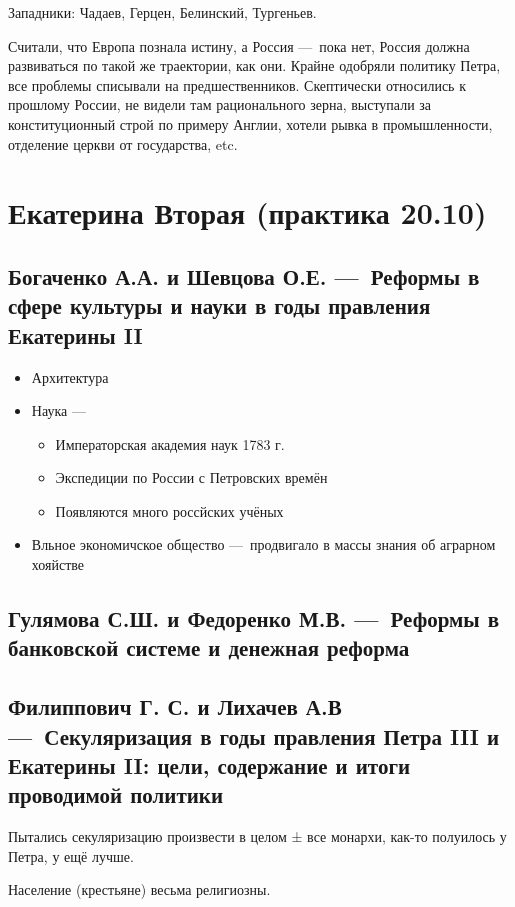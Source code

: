 \documentclass[12pt, a4paper]{article}
\begin{document}
    Западники: Чадаев, Герцен, Белинский, Тургеньев.

    Считали, что Европа познала истину, а Россия — пока нет, Россия должна развиваться по такой же траектории, как они.
    Крайне одобряли политику Петра, все проблемы списывали на предшественников.
    Скептически относились к прошлому России, не видели там рационального зерна, выступали за конституционный строй по примеру Англии,
    хотели рывка в промышленности, отделение церкви от государства, etc.

    \section{Екатерина Вторая (практика 20.10)}

    \subsection{Богаченко А.А. и Шевцова О.Е. — Реформы в сфере культуры и науки в годы правления Екатерины II}

    \begin{itemize}
        \item Архитектура
        \item Наука — 
        \begin{itemize}
            \item Императорская академия наук 1783 г.
            \item Экспедиции по России с Петровских времён
            \item Появляются много россйских учёных
        \end{itemize}
    \item Вльное экономичское общество — продвигало в массы знания об аграрном хояйстве
    \end{itemize}

    \subsection{Гулямова С.Ш. и Федоренко М.В. — Реформы в банковской системе и денежная реформа}


    \subsection{Филиппович Г. С. и Лихачев А.В — Секуляризация в годы правления Петра III и Екатерины II: цели, содержание и итоги проводимой политики}

    Пытались секуляризацию произвести в целом ± все монархи, как-то полуилось у Петра, у ещё лучше.

    Население (крестьяне) весьма религиозны.
\end{document}
